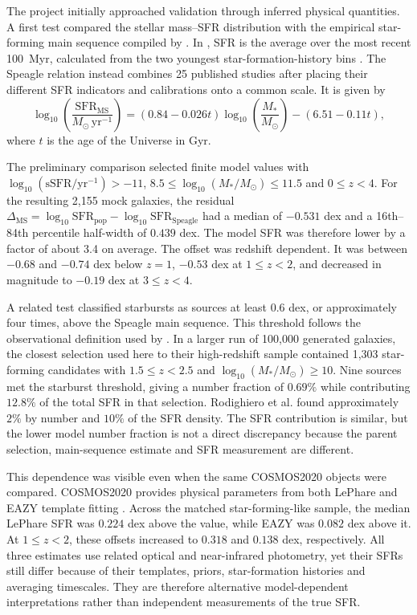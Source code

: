 \documentclass[12pt,a4paper]{article}
\begin{document}
The project initially approached validation through inferred physical quantities. A
first test compared the \popcosmos{} stellar mass--SFR distribution with the empirical
star-forming main sequence compiled by \citet{Speagle_2014}. In \popcosmos{}, SFR is
the average over the most recent \SI{100}{Myr}, calculated from the two youngest
star-formation-history bins \citep{Thorp_2025_insights}. The Speagle relation instead
combines 25 published studies after placing their different SFR indicators and
calibrations onto a common scale. It is given by
\begin{equation}
  \log_{10}\!\left(\frac{\mathrm{SFR}_{\mathrm{MS}}}{M_\odot\,\mathrm{yr}^{-1}}\right)
  = (0.84-0.026t)\log_{10}\!\left(\frac{M_*}{M_\odot}\right)
    -(6.51-0.11t),
  \label{eq:speagle}
\end{equation}
where $t$ is the age of the Universe in Gyr.

The preliminary comparison selected finite model values with
$\log_{10}(\mathrm{sSFR}/\mathrm{yr}^{-1})>-11$,
$8.5\leq\log_{10}(M_*/M_\odot)\leq11.5$ and $0\leq z<4$. For the resulting 2,155
mock galaxies, the residual
$\Delta_{\mathrm{MS}}=\log_{10}\mathrm{SFR}_{\mathrm{pop}}
-\log_{10}\mathrm{SFR}_{\mathrm{Speagle}}$ had a median of $-0.531$ dex and a
16th--84th percentile half-width of $0.439$ dex. The model SFR was therefore lower by
a factor of about 3.4 on average. The offset was redshift dependent. It was between
$-0.68$ and $-0.74$ dex below $z=1$, $-0.53$ dex at $1\leq z<2$, and decreased in
magnitude to $-0.19$ dex at $3\leq z<4$.

A related test classified starbursts as sources at least $0.6$ dex, or approximately
four times, above the Speagle main sequence. This threshold follows the observational
definition used by \citet{Rodighiero_2011}. In a larger run of 100,000 generated
galaxies, the closest selection used here to their high-redshift sample contained 1,303
star-forming candidates with $1.5\leq z<2.5$ and
$\log_{10}(M_*/M_\odot)\geq10$. Nine sources met the starburst threshold, giving a
number fraction of $0.69\%$ while contributing $12.8\%$ of the total SFR in that
selection. Rodighiero et al. found approximately $2\%$ by number and $10\%$ of the SFR
density. The SFR contribution is similar, but the lower model number fraction is not a
direct discrepancy because the parent selection, main-sequence estimate and SFR
measurement are different.

This dependence was visible even when the same COSMOS2020 objects were compared.
COSMOS2020 provides physical parameters from both LePhare and EAZY template fitting
\citep{Weaver_2022}. Across the matched star-forming-like sample, the median LePhare
SFR was $0.224$ dex above the \popcosmos{} value, while EAZY was $0.082$ dex above it.
At $1\leq z<2$, these offsets increased to $0.318$ and $0.138$ dex, respectively.
All three estimates use related optical and near-infrared photometry, yet their SFRs
still differ because of their templates, priors, star-formation histories and averaging
timescales. They are therefore alternative model-dependent interpretations rather than
independent measurements of the true SFR.
\end{document}
